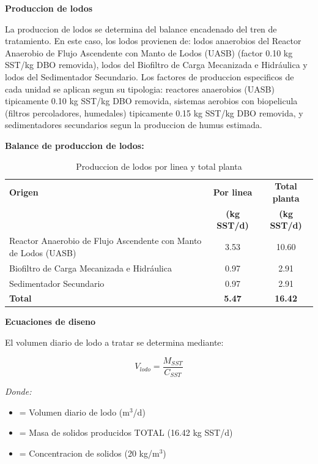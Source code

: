 \documentclass[12pt,a4paper]{article}
\begin{document}
\textbf{Produccion de lodos}

La produccion de lodos se determina del balance encadenado del tren de tratamiento. En este caso, los lodos provienen de: lodos anaerobios del Reactor Anaerobio de Flujo Ascendente con Manto de Lodos (UASB) (factor 0.10 kg SST/kg DBO removida), lodos del Biofiltro de Carga Mecanizada e Hidráulica y lodos del Sedimentador Secundario. Los factores de produccion especificos de cada unidad se aplican segun su tipologia: reactores anaerobios (UASB) tipicamente 0.10 kg SST/kg DBO removida, sistemas aerobios con biopelicula (filtros percoladores, humedales) tipicamente 0.15 kg SST/kg DBO removida, y sedimentadores secundarios segun la produccion de humus estimada.

\textbf{Balance de produccion de lodos:}

\begin{table}[H]
\centering
\small
\caption{Produccion de lodos por linea y total planta}
\begin{tabular}{p{6cm}cc}
\toprule
\textbf{Origen} & \textbf{Por linea} & \textbf{Total planta} \\
 & \textbf{(kg SST/d)} & \textbf{(kg SST/d)} \\
\midrule
Reactor Anaerobio de Flujo Ascendente con Manto de Lodos (UASB) & 3.53 & 10.60 \\
Biofiltro de Carga Mecanizada e Hidráulica & 0.97 & 2.91 \\
Sedimentador Secundario & 0.97 & 2.91 \\
\midrule
\textbf{Total} & \textbf{5.47} & \textbf{16.42} \\
\bottomrule
\end{tabular}
\end{table}

\textbf{Ecuaciones de diseno}

El volumen diario de lodo a tratar se determina mediante:

\begin{equation}
V_{lodo} = \frac{M_{SST}}{C_{SST}}
\end{equation}

\textit{Donde:}
\begin{itemize}[noitemsep,leftmargin=2em]
    \item[$V_{lodo}$] = Volumen diario de lodo (m$^3$/d)
    \item[$M_{SST}$] = Masa de solidos producidos TOTAL (16.42 kg SST/d)
    \item[$C_{SST}$] = Concentracion de solidos (20 kg/m$^3$)
\end{itemize}
\end{document}
